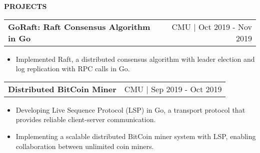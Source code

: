 \documentclass[letterpaper,11pt]{article}
\makeatletter
\newcommand{\resitem}[1]{\item  #1}
\newcommand{\resheading}[1]{{\large \colorbox{mygrey}{\begin{minipage}{\linewidth}{\textbf{#1 \vphantom{p\^{E}}}}\end{minipage}}}}
\newcommand{\ressubsubheading}[2]{
\begin{tabular*}{1.04\linewidth}{l@{\extracolsep{\fill}}r}
	\textbf{#1} & #2 \\
\end{tabular*}\vspace{-6pt}}
\makeatother
\begin{document}
\resheading{PROJECTS}
	\begin{description}
		\item
			\ressubsubheading{GoRaft: Raft Consensus Algorithm in Go}{CMU $|$ Oct 2019 - Nov 2019}
				{ \footnotesize
				\begin{itemize}
					\resitem{Implemented Raft, a distributed consensus algorithm with leader election and log replication with RPC calls in Go.}
				\end{itemize}
				}
		\item
			\ressubsubheading{Distributed BitCoin Miner}{CMU $|$ Sep 2019 - Oct 2019}
			{ \footnotesize
			\begin{itemize}
				\resitem{Developing Live Sequence Protocol (LSP) in Go, a transport protocol that provides reliable client-server communication.}
				\resitem{Implementing a scalable distributed BitCoin miner system with LSP, enabling collaboration between unlimited coin miners.}

			\end{itemize}
			}

	\end{description}  %
\end{document}

